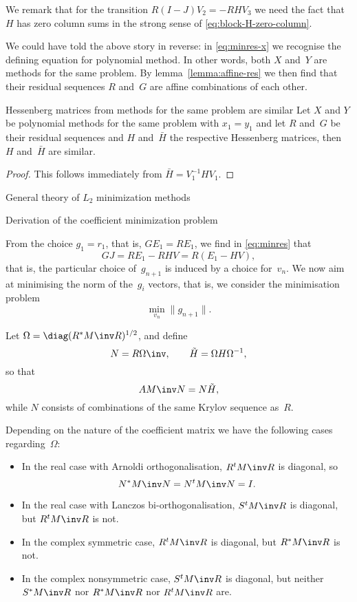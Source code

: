 \documentclass[11pt]{artikel3}
\begin{document}
\begin{Outline}
\begin{block}
We remark that for the transition $R(I-J)V_2=-RHV_3$ we need the fact
that $H$ has zero column sums in the strong sense of
\eqref{eq:block-H-zero-column}.
\end{block}

We could have told the above story in reverse: in \eqref{eq:minres-x}
we recognise the defining equation for polynomial method. In other
words, both $X$ and~$Y$ are methods for the same problem. By
lemma~\ref{lemma:affine-res} we then find that their residual
sequences $R$ and~$G$ are affine combinations of each other.

\begin{ccorollary}{Hessenberg matrices from methods for the same
problem are similar}
Let $X$ and $Y$ be polynomial methods for the same problem with
$x_1=y_1$ and let $R$ and~$G$ be their residual sequences and $H$
and~$\bar H$ the respective Hessenberg matrices, then $H$ and~$\bar H$
are similar.
\end{ccorollary}
\begin{proof}
This follows immediately from $\bar H=V_1^{-1}HV_1$.
\end{proof}

 {General theory of $L_2$ minimization methods}
\label{sec:minres-method}

 {Derivation of the coefficient minimization problem}
\label{sec:minres-derivation}

From the choice $g_1=r_1$, that is, $GE_1=RE_1$, we find 
in \eqref{eq:minres} that
\[ GJ=RE_1-RHV = R(E_1-HV), \]
that is, the particular choice of~$g_{n+1}$ is induced by 
a choice for~$v_n$.
We now aim at minimising the norm of the~$g_i$ vectors, that is,
we consider the minimisation problem
\begin{equation} \min_{v_n}\|g_{n+1}\|.
    \label{eq:true-min-problem}\end{equation}

Let $\Omega=\diag(R^*M\inv R)^{1/2}$, and define 
\[ N=R\Omega\inv, \qquad\tilde H=\Omega H\Omega^{-1}, \]
so that 
\begin{equation} AM\inv N=N\tilde H,
    \label{eq:AR=RH-normalised}\end{equation}
while $N$ consists of combinations of the
same Krylov sequence as~$R$.

Depending on the nature of the coefficient matrix we have the following
cases regarding~$\Omega$:
\begin{itemize}
\item In the real case with Arnoldi orthogonalisation,
$R^tM\inv R$ is diagonal,
so \[N^*M\inv N=N^tM\inv N=I.\]
\item In the real case with Lanczos bi-orthogonalisation,
$S^tM\inv R$ is diagonal,
but $R^tM\inv R$ is not.
\item In the complex symmetric case, $R^tM\inv R$ is diagonal,
but $R^*M\inv R$ is not.
\item In the complex nonsymmetric case, $S^tM\inv R$ is diagonal,
but neither $S^*M\inv R$ nor $R^*M\inv R$ nor $R^tM\inv R$ are.
\end{itemize}


\end{Outline}
\end{document}

